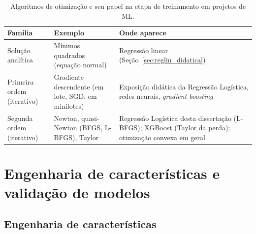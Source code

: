 \documentclass[msc]{on} %
\providecommand{\DIFaddbeginFL}{} %
\providecommand{\DIFaddendFL}{} %
\providecommand{\DIFdelbeginFL}{} %
\providecommand{\DIFdelendFL}{} %
\begin{document}
\begin{table}[htbp]
\centering
\small
\caption{Algoritmos de otimização e seu papel na etapa de treinamento em projetos de ML.}
\label{tab:otimizacao}
\DIFdelbeginFL %
\DIFdelendFL \DIFaddbeginFL \begin{tabular}{@{}p{3.0cm}p{4.8cm}p{6.2cm}@{}}
\hline
\textbf{Família} & \textbf{Exemplo} & \textbf{Onde aparece} \\
\hline
Solução analítica & Mínimos quadrados (equação normal) & Regressão linear (Seção~\ref{sec:reglin_didatica}) \\
\hline
Primeira ordem (iterativo) & Gradiente descendente (em lote, SGD, em minilotes) & Exposição didática da Regressão Logística, redes neurais, \textit{gradient boosting} \\
\hline
Segunda ordem (iterativo) & Newton, quasi-Newton (BFGS, L-BFGS), Taylor & Regressão Logística desta dissertação (L-BFGS); XGBoost (Taylor da perda); otimização convexa em geral \\
\hline
\end{tabular}
\DIFaddendFL \end{table}

\section{Engenharia de características e validação de modelos}
\label{sec:feature_validacao}

\subsection{Engenharia de características}
\end{document}
